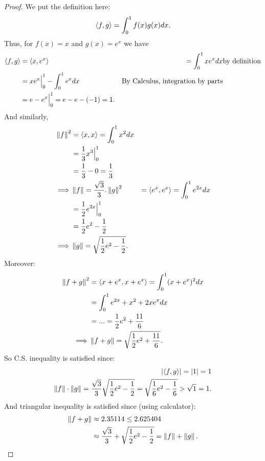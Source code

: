 \begin{proof}
We put the definition here:
\[
    \left< f, g \right> = \int_0^1 f(x)g(x) dx.
\]
Thus, for \(f(x) = x\) and \(g(x) = e^x\) we have
\begin{align*}
    \left< f, g \right> & = \left< x, e^x \right> & = \int_0^1 x e^x dx & \text{by definition} \\
    & = xe^x \Big|_0^1 - \int_0^1 e^x dx & \text{By Calculus, integration by parts} \\
    & = e - e^x \Big|_0^1 = e - e - (-1) = 1.
\end{align*}
And similarly,
\begin{align*}
    \left\lVert f\right\rVert^2 & = \left< x, x \right> = \int_0^1 x^2 dx \\
        & = \frac{1}{3}x^3 \Big|_0^1 \\
        & = \frac{1}{3} - 0 = \frac{1}{3} \\
    \implies & \left\lVert f\right\rVert = \frac{\sqrt{3}}{3}.
    \left\lVert g\right\rVert^2 & = \left< e^x, e^x \right> = \int_0^1 e^{2x} dx \\
        & = \frac{1}{2} e^{2x} \Big|_0^1 \\
        & = \frac{1}{2} e^2 - \frac{1}{2} \\
    \implies & \left\lVert g\right\rVert = \sqrt{\frac{1}{2} e^2 - \frac{1}{2}}.
\end{align*}
Moreover:
\begin{align*}
    \left\lVert f + g\right\rVert^2 & = \left< x + e^x, x + e^x \right> = \int_0^1 (x + e^x)^2 dx \\
    & = \int_0^1 e^{2x} + x^2 + 2xe^x dx \\
    & = ... = \frac{1}{2}e^2 + \frac{11}{6} \\
    \implies & \left\lVert f + g\right\rVert = \sqrt{\frac{1}{2}e^2 + \frac{11}{6}}.
\end{align*}
So C.S. inequality is satisfied since:
\begin{align*}
    \lvert\left< f, g \right>\rvert = \lvert1\rvert = 1 \\
    \left\lVert f\right\rVert \cdot \left\lVert g\right\rVert = \frac{\sqrt{3}}{3} \sqrt{\frac{1}{2} e^2 - \frac{1}{2}} = \sqrt{\frac{1}{6}e^2 - \frac{1}{6}} > \sqrt{1} = 1.
\end{align*}
And triangular inequality is satisfied since (using calculator):
\begin{align*}
    \left\lVert f + g\right\rVert & \approx 2.35114 \le 2.625404 \\
        & \approx \frac{\sqrt{3}}{3} + \sqrt{\frac{1}{2} e^2 - \frac{1}{2}} = \left\lVert f\right\rVert + \left\lVert g\right\rVert.
\end{align*}
\end{proof}

